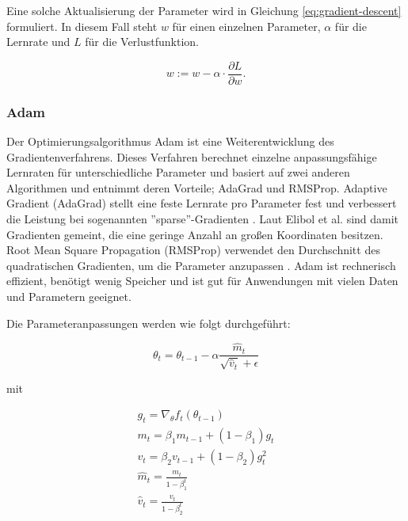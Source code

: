 \mypar Eine solche Aktualisierung der Parameter wird in Gleichung \ref{eq:gradient-descent} formuliert. In diesem Fall steht $w$ für einen einzelnen Parameter, $\alpha$ für die Lernrate und $L$ für die Verlustfunktion.

\begin{equation}\label{eq:gradient-descent}
w:=w-\alpha \cdot \frac{\partial L}{\partial w}. 
\end{equation}


\subsubsection{Adam}
Der Optimierungsalgorithmus Adam ist eine Weiterentwicklung des Gradientenverfahrens. Dieses Verfahren berechnet einzelne anpassungsfähige Lernraten für unterschiedliche Parameter und basiert auf zwei anderen Algorithmen und entnimmt deren Vorteile; AdaGrad und RMSProp. Adaptive Gradient (AdaGrad) stellt eine feste Lernrate pro Parameter fest und verbessert die Leistung bei sogenannten ''sparse''-Gradienten \cite{adagrad}. Laut Elibol et al. \cite{variance-red-w-sparse-grads} sind damit Gradienten gemeint, die eine geringe Anzahl an großen Koordinaten besitzen. Root Mean Square Propagation (RMSProp) verwendet den Durchschnitt des quadratischen Gradienten, um die Parameter anzupassen \cite{rmsprop}. Adam ist rechnerisch effizient, benötigt wenig Speicher und ist gut für Anwendungen mit vielen Daten und Parametern geeignet. \cite{adam-paper}

\mypar Die Parameteranpassungen werden wie folgt durchgeführt:

\begin{equation}\label{eq:adam1}
\theta_t = \theta_{t-1}-\alpha \frac{\hat{m}_t}{\sqrt{\hat{v}_t}+\epsilon}
\end{equation}

\mypar mit

\begin{equation}\label{eq:adam2}
\begin{aligned}
g_t = \nabla_{\theta} f_t(\theta_{t-1}) \\
m_t = \beta_1 m_{t-1} + (1-\beta_1)g_t \\
v_t = \beta_2 v_{t-1} + (1-\beta_2)g^2_t \\
\hat{m}_t = \frac{m_t}{1-\beta^t_1} \\
\hat{v}_t = \frac{v_t}{1-\beta^t_2}
\end{aligned}
\end{equation}

